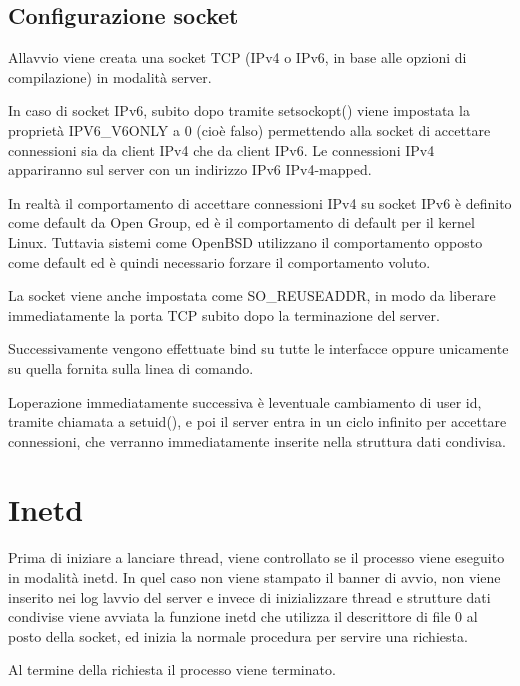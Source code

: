 \documentclass[a4paper,11pt]{article}
\begin{document}
\subsection{Configurazione socket}
{\sffamily
All{\textquotesingle}avvio viene creata una socket TCP (IPv4 o IPv6, in
base alle opzioni di compilazione) in modalit\`a server.}

{\sffamily
In caso di socket IPv6, subito dopo tramite setsockopt() viene impostata
la propriet\`a IPV6\_V6ONLY a 0 (cio\`e falso) permettendo alla socket
di accettare connessioni sia da client IPv4 che da client IPv6\cite{LIBC08}.
Le connessioni IPv4 appariranno sul server con un indirizzo IPv6
IPv4-mapped\cite{LIBC09}.}

{\sffamily
In realt\`a il comportamento di accettare connessioni IPv4 su socket
IPv6 \`e definito come default da Open Group, ed \`e il comportamento
di default per il kernel Linux. Tuttavia sistemi come OpenBSD
utilizzano il comportamento opposto come default\cite{KER02} ed \`e quindi
necessario forzare il comportamento voluto.}

{\sffamily
La socket viene anche impostata come SO\_REUSEADDR, in modo da liberare
immediatamente la porta TCP subito dopo la terminazione del
server\cite{LIBC08}.}

{\sffamily
Successivamente vengono effettuate bind su tutte le interfacce oppure
unicamente su quella fornita sulla linea di comando.}

{\sffamily
L{\textquotesingle}operazione immediatamente successiva \`e
l{\textquotesingle}eventuale cambiamento di user id, tramite chiamata a
setuid(), e poi il server entra in un ciclo infinito per accettare
connessioni, che verranno immediatamente inserite nella struttura dati
condivisa.}

\section{Inetd}
{\sffamily
Prima di iniziare a lanciare thread, viene controllato se il processo
viene eseguito in modalit\`a inetd. In quel caso non viene stampato il
banner di avvio, non viene inserito nei log l{\textquotesingle}avvio
del server e invece di inizializzare thread e strutture dati condivise
viene avviata la funzione inetd che utilizza il descrittore di file 0
al posto della socket, ed inizia la normale procedura per servire una
richiesta.}

{\sffamily
Al termine della richiesta il processo viene terminato.}
\end{document}
